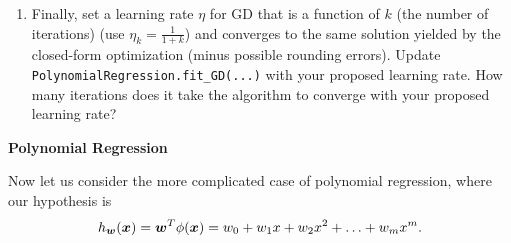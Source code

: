 \documentclass[11pt]{article}
\begin{document}
\begin{enumerate}[resume]
\begin{itemize}
\solution{
}
\end{itemize}

\item Finally, set a learning rate $\eta$ for GD that is a function of $k$ (the number of iterations) (use $\eta_k = \tfrac{1}{1+k}$) and converges to the same solution yielded by the closed-form optimization (minus possible rounding errors). Update \verb|PolynomialRegression.fit_GD(...)| with your proposed learning rate. How many iterations does it take the algorithm to converge with your proposed learning rate? 

\solution{
}

\end{enumerate}



\vspace{10pt} {\large \textbf{Polynomial Regression}}

Now let us consider the more complicated case of polynomial regression, where our hypothesis is
\begin{equation*}
h_{\boldsymbol{w}}(\boldsymbol{x}) = \boldsymbol{w}^T \phi(\boldsymbol{x}) = w_0 + w_1 x + w_2 x^2 + \ldots + w_m x^m.
\end{equation*}
\end{document}
